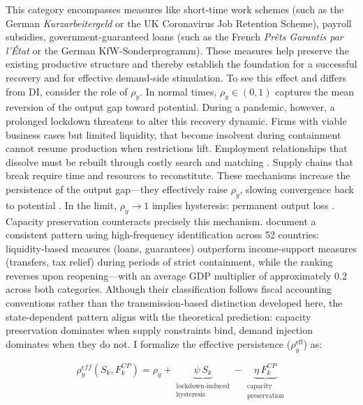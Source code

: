 This category encompasses measures like short-time work schemes (such as the German \textit{Kurzarbeitergeld} or the UK Coronavirus Job Retention Scheme), payroll subsidies, government-guaranteed loans (such as the French \textit{Pr\^{e}ts Garantis par l'\'{E}tat} or the German KfW-Sonderprogramm). These measures help preserve the existing productive structure and thereby establish the foundation for a successful recovery and for effective demand-side stimulation. To see this effect and differs from DI, consider the role of $\rho_y$. In normal times, $\rho_y\in (0,1)$ captures the mean reversion of the output gap toward potential. During a pandemic, however, a prolonged lockdown threatens to alter this recovery dynamic. Firms with viable business cases but limited liquidity, that become insolvent during containment cannot resume production when restrictions lift. Employment relationships that dissolve must be rebuilt through costly search and matching \citep{Fujita2024}. Supply chains that break require time and resources to reconstitute. These mechanisms increase the persistence of the output gap---they effectively raise $\rho_y^{\text{}}$, slowing convergence back to potential \citep{Kozlowski2020, Cerra2020}. In the limit, $\rho_y^{\text{}} \to 1$ implies hysteresis: permanent output loss \citep{BLANCHARD1987}. Capacity preservation counteracts precisely this mechanism. \citet{deb2021} document a consistent pattern using high-frequency identification across 52 countries: liquidity-based measures (loans, guarantees) outperform income-support measures (transfers, tax relief) during periods of strict containment, while the ranking reverses upon reopening---with an average GDP multiplier of approximately 0.2 across both categories. Although their classification follows fiscal accounting conventions rather than the transmission-based distinction developed here, the state-dependent pattern aligns with the theoretical prediction: capacity preservation dominates when supply constraints bind, demand injection dominates when they do not. I formalize the effective persistence ($\rho_y^{\text{eff}}$) as:

%
\begin{equation}
    \rho_y^{eff}(S_k, F_k^{CP}) = \rho_y
      + \underbrace{\psi \, S_k}_{\substack{\text{lockdown-induced} \\ \text{hysteresis}}}
      - \underbrace{\eta \, F_k^{CP}}_{\substack{\text{capacity} \\ \text{preservation}}}
    \label{eq:rho_eff}
\end{equation}
%

